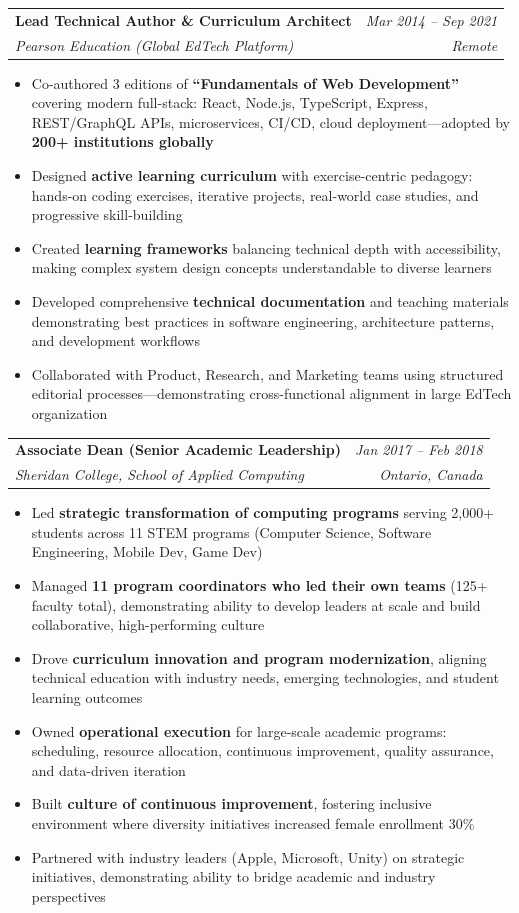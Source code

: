 \documentclass[11pt]{article}
\makeatletter
\newcommand{\tech}[1]{\textcolor{secondary}{\textbf{#1}}}
\newcommand{\experience}[4]{
  \vspace{4pt}
  \begin{tabular*}{\textwidth}{@{}l@{\extracolsep{\fill}}r@{}}
    \textbf{#1} & \textit{#2} \\
    \textit{\small#3} & \textit{\small#4}
  \end{tabular*}
  \vspace{-4pt}
}
\makeatother
\begin{document}
\experience{Lead Technical Author \& Curriculum Architect}{Mar 2014 -- Sep 2021}{Pearson Education (Global EdTech Platform)}{Remote}
\begin{itemize}
    \item Co-authored 3 editions of \tech{``Fundamentals of Web Development''} covering modern full-stack: React, Node.js, TypeScript, Express, REST/GraphQL APIs, microservices, CI/CD, cloud deployment—adopted by \tech{200+ institutions globally}
    \item Designed \tech{active learning curriculum} with exercise-centric pedagogy: hands-on coding exercises, iterative projects, real-world case studies, and progressive skill-building
    \item Created \tech{learning frameworks} balancing technical depth with accessibility, making complex system design concepts understandable to diverse learners
    \item Developed comprehensive \tech{technical documentation} and teaching materials demonstrating best practices in software engineering, architecture patterns, and development workflows
    \item Collaborated with Product, Research, and Marketing teams using structured editorial processes—demonstrating cross-functional alignment in large EdTech organization
\end{itemize}

\experience{Associate Dean (Senior Academic Leadership)}{Jan 2017 -- Feb 2018}{Sheridan College, School of Applied Computing}{Ontario, Canada}
\begin{itemize}
    \item Led \tech{strategic transformation of computing programs} serving 2,000+ students across 11 STEM programs (Computer Science, Software Engineering, Mobile Dev, Game Dev)
    \item Managed \tech{11 program coordinators who led their own teams} (125+ faculty total), demonstrating ability to develop leaders at scale and build collaborative, high-performing culture
    \item Drove \tech{curriculum innovation and program modernization}, aligning technical education with industry needs, emerging technologies, and student learning outcomes
    \item Owned \tech{operational execution} for large-scale academic programs: scheduling, resource allocation, continuous improvement, quality assurance, and data-driven iteration
    \item Built \tech{culture of continuous improvement}, fostering inclusive environment where diversity initiatives increased female enrollment 30\%
    \item Partnered with industry leaders (Apple, Microsoft, Unity) on strategic initiatives, demonstrating ability to bridge academic and industry perspectives
\end{itemize}
\end{document}
